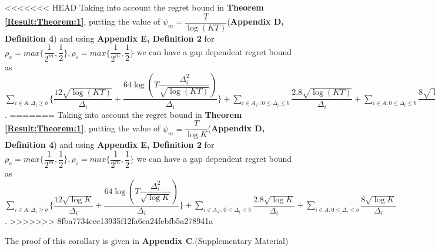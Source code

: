 \begin{corollary}
\label{Result:Corollary:2}
<<<<<<< HEAD
Taking into account the regret bound in \textbf{Theorem \ref{Result:Theorem:1}}, putting the value of $\psi_{m}=\dfrac{T}{\log (KT)}$(\textbf{Appendix D, Definition 4}) and using \textbf{Appendix E, Definition 2} for $\rho_{a}=max\bigg\lbrace\dfrac{1}{2^{m}},\dfrac{1}{2}\bigg\rbrace,\rho_{s}=max\bigg\lbrace\dfrac{1}{2^{m}},\dfrac{1}{2}\bigg\rbrace $ we can have a gap dependent regret bound as $ \sum_{i\in A:\Delta_{i}\geq b}\bigg\lbrace\dfrac{12\sqrt{\log (KT)}}{\Delta_{i}}  + \dfrac{64\log{(T\dfrac{\Delta_{i}^{2}}{\sqrt{\log (KT)}})}}{\Delta_{i}}\bigg\rbrace + \sum\limits_{i\in A_{s^{*}}:0\leq\Delta_{i}\leq b}\dfrac{2.8\sqrt{\log (KT)}}{\Delta_{i}} + \sum\limits_{i\in A:0\leq\Delta_{i}\leq b}\dfrac{8\sqrt{\log (KT)}}{\Delta_{i}}$.
=======
Taking into account the regret bound in \textbf{Theorem \ref{Result:Theorem:1}}, putting the value of $\psi_{m}=\dfrac{T}{\log K}$(\textbf{Appendix D, Definition 4}) and using \textbf{Appendix E, Definition 2} for $\rho_{a}=max\bigg\lbrace\dfrac{1}{2^{m}},\dfrac{1}{2}\bigg\rbrace,\rho_{s}=max\bigg\lbrace\dfrac{1}{2^{m}},\dfrac{1}{2}\bigg\rbrace $ we can have a gap dependent regret bound as $ \sum_{i\in A:\Delta_{i}\geq b}\bigg\lbrace\dfrac{12\sqrt{\log K}}{\Delta_{i}}  + \dfrac{64\log{(T\dfrac{\Delta_{i}^{2}}{\sqrt{\log K}})}}{\Delta_{i}}\bigg\rbrace + \sum\limits_{i\in A_{s^{*}}:0\leq\Delta_{i}\leq b}\dfrac{2.8\sqrt{\log K}}{\Delta_{i}} + \sum\limits_{i\in A:0\leq\Delta_{i}\leq b}\dfrac{8\sqrt{\log K}}{\Delta_{i}}$.
>>>>>>> 8fba7734eee13935f12fa6ca24febfb5a278941a
\end{corollary}

	The proof of this corollary is given in \textbf{Appendix C}.(Supplementary Material)

